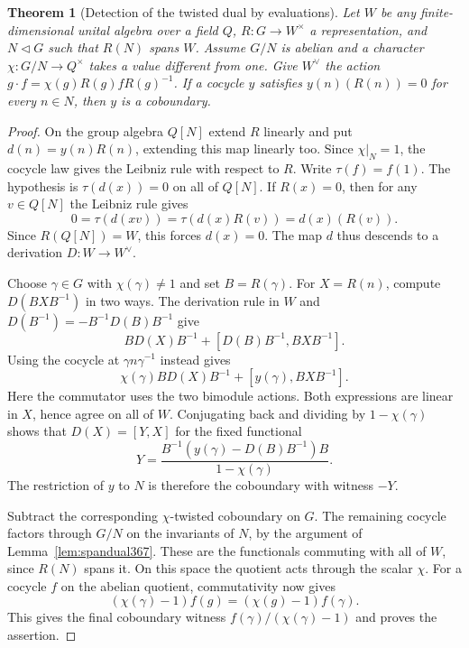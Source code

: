 \documentclass[a4paper,11pt]{article}
\newtheorem{theorem}[proposition]{Theorem}
\theoremstyle{definition}
\theoremstyle{remark}
\numberwithin{equation}{section}
\begin{document}
\begin{theorem}[Detection of the twisted dual by evaluations]
\label{thm:derivation367}
Let \(W\) be any finite-dimensional unital algebra over a
field \(Q\), \(R:G\to W^\times\) a representation, and
\(N\triangleleft G\) such that \(R(N)\) spans \(W\).
Assume \(G/N\) is abelian and a character
\(\chi:G/N\to Q^\times\) takes a value different from one.
Give \(W^\vee\) the action \(g\cdot f=\chi(g)R(g)fR(g)^{-1}\).
If a cocycle \(y\) satisfies \(y(n)(R(n))=0\) for every
\(n\in N\), then \(y\) is a coboundary.
\end{theorem}
\begin{proof}
On the group algebra \(Q[N]\) extend \(R\) linearly and put
\(d(n)=y(n)R(n)\), extending this map linearly too. Since
\(\chi|_N=1\), the cocycle law gives the Leibniz rule with
respect to \(R\). Write \(\tau(f)=f(1)\). The hypothesis is
\(\tau(d(x))=0\) on all of \(Q[N]\). If \(R(x)=0\), then
for any \(v\in Q[N]\) the Leibniz rule gives
\[
              0=\tau(d(xv))=\tau(d(x)R(v))=d(x)(R(v)).
\]
Since \(R(Q[N])=W\), this forces \(d(x)=0\). The map \(d\)
thus descends to a derivation \(D:W\to W^\vee\).

Choose \(\gamma\in G\) with \(\chi(\gamma)\ne1\) and set
\(B=R(\gamma)\). For \(X=R(n)\), compute
\(D(BXB^{-1})\) in two ways. The derivation rule in \(W\)
and \(D(B^{-1})=-B^{-1}D(B)B^{-1}\) give
\[
             B D(X) B^{-1}+[D(B)B^{-1},BXB^{-1}].
\]
Using the cocycle at \(\gamma n\gamma^{-1}\) instead gives
\[
             \chi(\gamma)B D(X)B^{-1}+[y(\gamma),BXB^{-1}].
\]
Here the commutator uses the two bimodule actions.
Both expressions are linear in \(X\), hence agree on all
of \(W\). Conjugating back and dividing by
\(1-\chi(\gamma)\) shows that \(D(X)=[Y,X]\) for the fixed
functional
\[
          Y=\frac{B^{-1}(y(\gamma)-D(B)B^{-1})B}
                        {1-\chi(\gamma)} .
\]
The restriction of \(y\) to \(N\) is therefore the
coboundary with witness \(-Y\).

Subtract the corresponding \(\chi\)-twisted coboundary on
\(G\). The remaining cocycle factors through \(G/N\) on the
invariants of \(N\), by the argument of
Lemma~\ref{lem:spandual367}. These are the functionals
commuting with all of \(W\), since \(R(N)\) spans it.
On this space the quotient acts through the scalar \(\chi\).
For a cocycle \(f\) on the abelian quotient, commutativity
now gives
\[
   (\chi(\gamma)-1) f(g)=(\chi(g)-1) f(\gamma).
\]
This gives the final coboundary witness
\(f(\gamma)/(\chi(\gamma)-1)\) and proves the assertion.
\end{proof}
\end{document}

